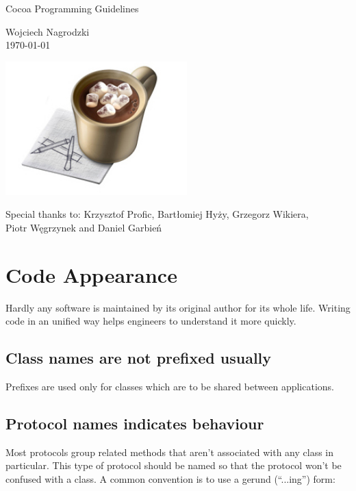 \documentclass[10pt]{extarticle}
\begin{document}
\begin{titlepage}
\begin{center}
\Huge Cocoa Programming Guidelines

\vspace{10mm}
\large Wojciech Nagrodzki\\ \today

\vspace{70mm}
\includegraphics[width=70mm]{cocoa_cup.jpg}

\vspace{80mm}
Special thanks to: Krzysztof Profic, Bartłomiej Hyży, Grzegorz Wikiera,\\Piotr Węgrzynek and Daniel Garbień


\end{center}
\end{titlepage}


\tableofcontents

\section{Code Appearance}


Hardly any software is maintained by its original author for its whole life. Writing code in an unified way helps engineers to understand it more quickly.


\subsection{Class names are not prefixed usually}

Prefixes are used only for classes which are to be shared between applications.


\subsection{Protocol names indicates behaviour}
Most protocols group related methods that aren’t associated with any class in particular. This type of protocol should be named so that the protocol won’t be confused with a class. A common convention is to use a gerund (“...ing”) form:
\end{document}
